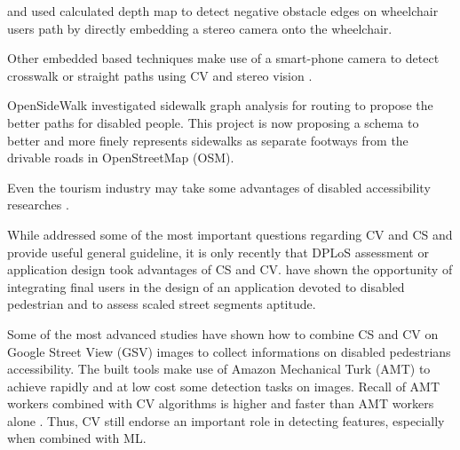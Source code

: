 \documentclass[10pt,conference,a4paper]{IEEEtran}
\begin{document}
\cite{coughlan_terrain_2007} and \cite{ivanchenko_computer_2008} used calculated depth map to detect negative obstacle edges on wheelchair users path by directly embedding a stereo camera onto the wheelchair. 

Other embedded based techniques make use of a smart-phone camera to detect crosswalk \cite{ivanchenko_crosswatch:_2008} or straight paths using CV and stereo vision \cite{asad_smartphone_2012}.

OpenSideWalk \cite{bolten_urban_2015} investigated sidewalk graph analysis for routing to propose the better paths for disabled people. This project is now proposing a schema to better and more finely represents sidewalks as separate footways from the drivable roads in OpenStreetMap (OSM).%

Even the tourism industry may take some advantages of disabled accessibility researches \cite{israeli_preliminary_2002}.


While \cite{kovashka2016crowdsourcing} addressed some of the most important questions regarding CV and CS and provide useful general guideline, it is only recently that DPLoS assessment or application design took advantages of CS and CV.
\cite{hara_feasibility_2012, comai_mapping_2015} have shown the opportunity of integrating final users in the design of an application devoted to disabled pedestrian and to assess scaled street segments aptitude.

Some of the most advanced studies \cite{hara_scalable_2014, hara_characterizing_2015} have shown how to combine CS and CV on Google Street View (GSV) images to collect informations on disabled pedestrians accessibility. The built tools \cite{hara_tohme:_2014} make use of Amazon Mechanical Turk (AMT) to achieve rapidly and at low cost some detection tasks on images. Recall of AMT workers combined with CV algorithms is higher and faster than AMT workers alone \cite{hara_combining_2013, hara_improving_2013, hara_improving_2015}. Thus, CV still endorse an important role in detecting features, especially when combined with ML.
\end{document}
